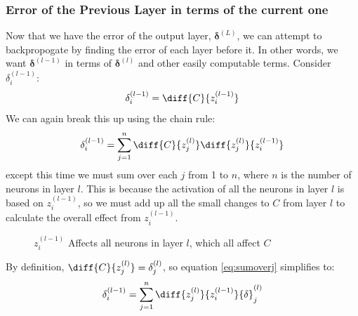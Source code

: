 \documentclass[12pt]{report}
\newcommand{\nodetext}[2]{$a^{\left(#1\right)}_#2$}
\begin{document}
\subsubsection{Error of the Previous Layer in terms of the current one}
Now that we have the error of the output layer, $\bm{\delta}^{\left(L\right)}$, we can attempt to backpropogate by finding the error of each layer before it. In other words, we want $\bm{\delta}^{\left(l-1\right)}$ in terms of $\bm{\delta}^{\left(l\right)}$ and other easily computable terms. Consider ${\delta}^{\left(l-1\right)}_i$:
\begin{equation}
    {\delta}^{\left(l-1\right)}_i=\diff{C}{z^{\left(l-1\right)}_i}
\end{equation}
We can again break this up using the chain rule:
\begin{equation}\label{eq:sumoverj}
    {\delta}^{\left(l-1\right)}_i=\displaystyle\sum_{j=1}^{n}\diff{C}{z^{\left(l\right)}_j}\diff{z^{\left(l\right)}_j}{z^{\left(l-1\right)}_i}
\end{equation}
except this time we must sum over each $j$ from 1 to $n$, where $n$ is the number of neurons in layer $l$. This is because the activation of all the neurons in layer $l$ is based on $z^{\left(l-1\right)}_i$, so we must add up all the small changes to $C$ from layer $l$ to calculate the overall effect from $z^{\left(l-1\right)}_i$.

\begin{figure}[H]
\centering
\begin{neuralnetwork}[nodespacing=15mm,layerspacing=30mm]
\inputlayer[count=5, title=Input Layer, text=\nodetext, bias=false]
\hiddenlayer[count=4, title=Hidden Layer 1, text=\nodetext, bias=false] \linklayers
\hiddenlayer[count=4, title=Hidden Layer 2, text=\nodetext, bias=false] \linklayers
\outputlayer[count=1, title=Output Layer, text=\nodetext, bias=false] \linklayers[style={black}]
\link[style={black}, labelpos=near end, from layer=1, to layer=2, from node=3, to node=1]
\link[style={black}, labelpos=near end, from layer=1, to layer=2, from node=3, to node=2]
\link[style={black}, labelpos=near end, from layer=1, to layer=2, from node=3, to node=3]
\link[style={black}, labelpos=near end, from layer=1, to layer=2, from node=3, to node=4]
\end{neuralnetwork}
\caption{$z^{\left(l-1\right)}_i$ Affects all neurons in layer $l$, which all affect $C$}
\end{figure}

By definition, $\diff{C}{z^{\left(l\right)}_j}={\delta}^{\left(l\right)}_j$, so equation \ref{eq:sumoverj} simplifies to:
\begin{equation}\label{eq:errorprevlayerpartiallysimplified}
    {\delta}^{\left(l-1\right)}_i=\displaystyle\sum_{j=1}^{n}\diff{z^{\left(l\right)}_j}{z^{\left(l-1\right)}_i}{\delta}^{\left(l\right)}_j
\end{equation}
\end{document}
